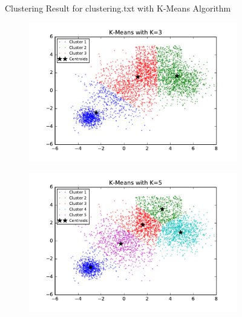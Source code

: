 \begin{description}
\begin{description}
\begin{figure}[!h]
\begin{subfigure}[b]{0.475\textwidth}
        \end{subfigure}        
        \caption{Clustering Result for clustering.txt with K-Means Algorithm}
        \label{fig:kmean_clustering}
\end{figure}

\vspace{2in}
\begin{figure}[!h]
        \centering
        \begin{subfigure}[b]{0.475\textwidth}
            \centering
            \includegraphics[width=\textwidth]{./figures/bigClustering_kMeans_3.pdf}
        \end{subfigure}
        \hfill  
        \begin{subfigure}[b]{0.475\textwidth}  
            \centering 
            \includegraphics[width=\textwidth]{./figures/bigClustering_kMeans_5.pdf}

\end{subfigure}
\end{figure}
\end{description}
\end{description}
